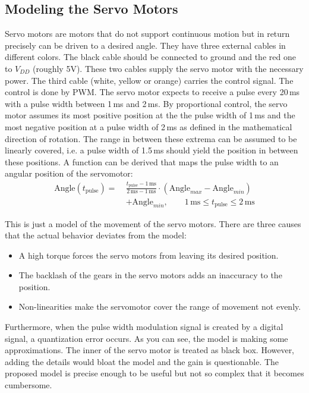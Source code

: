 \documentclass{sig-alternate-05-2015}
\begin{document}
\subsection{Modeling the Servo Motors}
Servo motors are motors that do not support continuous motion but in return precisely can be driven to a desired angle. They have three external cables in different colors. The black cable should be connected to ground and the red one to $V_{DD}$ (roughly 5V). These two cables supply the servo motor with the necessary power. The third cable (white, yellow or orange) carries the control signal. The control is done by PWM. The servo motor expects to receive a pulse every 20\,ms with a pulse width between 1\,ms and 2\,ms. By proportional control, the servo motor assumes its most positive position at the the pulse width of 1\,ms and the most negative position at a pulse width of 2\,ms as defined in the mathematical direction of rotation. The range in between these extrema can be assumed to be linearly covered, i.e. a pulse width of 1.5\,ms should yield the position in between these positions. A function can be derived that maps the pulse width to an angular position of the servomotor:
\begin{align*}
	\text{Angle}(t_\text{pulse}) =~& \frac{t_\text{pulse} -1\,\text{ms} }{2\,\text{ms}-1\,\text{ms}}\cdot \left(\text{Angle}_{max}-\text{Angle}_{min}\right) \\ & + \text{Angle}_{min}, \qquad 1\,\text{ms} \le t_\text{pulse}\le 2\,\text{ms}
\end{align*}

This is just a model of the movement of the servo motors. There are three causes that the actual behavior deviates from the model:
\begin{itemize}
	\item A high torque forces the servo motors from leaving its desired position.
	\item The backlash of the gears in the servo motors adds an inaccuracy to the position.
	\item Non-linearities make the servomotor cover the range of movement not evenly.
\end{itemize}
Furthermore, when the pulse width modulation signal is created by a digital signal, a quantization error occurs.
As you can see, the model is making some approximations. The inner of the servo motor is treated as black box. However, adding the details would bloat the model and the gain is questionable. The proposed model is precise enough to be useful but not so complex that it becomes cumbersome.
\end{document}
